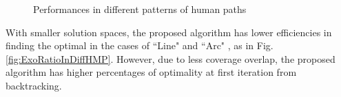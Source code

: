 \documentclass[12pt]{article}
\begin{document}
\begin{figure}[H] 
  \centering 
  \caption{Performances in different patterns of human paths} 
  \label{fig:PMdiffHP} %
\end{figure}

With smaller solution spaces, the proposed algorithm has lower efficiencies in finding the optimal in the cases of ``Line" and ``Arc" , as in Fig.\ref{fig:ExoRatioInDiffHMP}. However, due to less coverage overlap, the proposed algorithm has higher percentages of optimality at first iteration from backtracking. 
\end{document}
